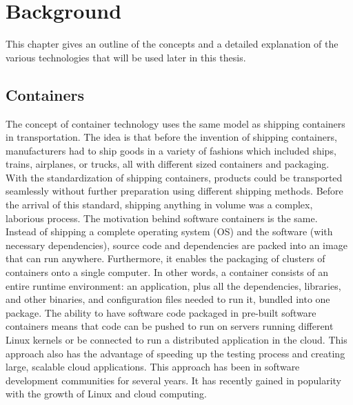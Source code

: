 \chapter{Background}
\label{Background}

This chapter gives an outline of the concepts and a detailed explanation of the various technologies that will be used later in this thesis.

	\section{Containers}
	\label{Background:Containers}
	The concept of container technology uses the same model as shipping containers in transportation. The idea is that before the invention of shipping containers, manufacturers had to ship goods in a variety of fashions which included ships, trains, airplanes, or trucks, all with different sized containers and packaging.
	With the standardization of shipping containers, products could be transported seamlessly without further preparation using different shipping methods. Before the arrival of this standard, shipping anything in volume was a complex, laborious process. The motivation behind software containers is the same. \cite[P.~1]{Kinnary2018}\\

	Instead of shipping a complete operating system (OS) and the software (with necessary dependencies), source code and dependencies are packed into an image that can run anywhere. Furthermore,  it enables the packaging of clusters of containers onto a single computer. In other words, a container consists of an entire runtime environment: an application, plus all the dependencies, libraries, and other binaries, and configuration files needed to run it, bundled into one package.
	The ability to have software code packaged in pre-built software containers means that code can be pushed to run on servers running different Linux kernels or be connected to run a distributed application in the cloud. This approach also has the advantage of speeding up the testing process and creating large, scalable cloud applications. This approach has been in software development communities for several years. It has recently gained in popularity with the growth of Linux and cloud computing. \cite[P.~2]{Kinnary2018}\\
	
